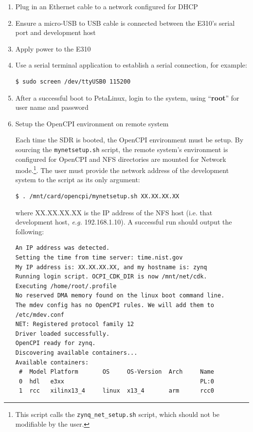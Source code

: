 \begin{enumerate}
\item Plug in an Ethernet cable to a network configured for DHCP
\item Ensure a micro-USB to USB cable is connected between the E310's serial port and development host
\item Apply power to the E310
\item Use a serial terminal application to establish a serial connection, for example:

\begin{verbatim}
$ sudo screen /dev/ttyUSB0 115200
\end{verbatim}

\item After a successful boot to PetaLinux, login to the system, using  ``\textbf{root}'' for user name and password

\item Setup the OpenCPI environment on remote system

\begin{flushleft}
Each time the SDR is booted, the OpenCPI environment must be setup. By sourcing the \texttt{mynetsetup.sh} script, the remote system's environment is configured for OpenCPI and NFS directories are mounted for Network mode.\footnote{This script calls the \texttt{zynq\_net\_setup.sh} script, which should not be modifiable by the user.}. The user must provide the network address of the development system to the script as its only argument:
\begin{verbatim}
$ . /mnt/card/opencpi/mynetsetup.sh XX.XX.XX.XX
\end{verbatim}

where XX.XX.XX.XX is the IP address of the NFS host (i.e. that development host, \textit{e.g.} 192.168.1.10). A successful run should output the following:
\begin{verbatim}
An IP address was detected.
Setting the time from time server: time.nist.gov
My IP address is: XX.XX.XX.XX, and my hostname is: zynq
Running login script. OCPI_CDK_DIR is now /mnt/net/cdk.
Executing /home/root/.profile
No reserved DMA memory found on the linux boot command line.
The mdev config has no OpenCPI rules. We will add them to /etc/mdev.conf
NET: Registered protocol family 12
Driver loaded successfully.
OpenCPI ready for zynq.
Discovering available containers...
Available containers:
 #  Model Platform       OS     OS-Version  Arch     Name
 0  hdl   e3xx                                       PL:0
 1  rcc   xilinx13_4     linux  x13_4       arm      rcc0
\end{verbatim}

\end{flushleft}
\end{enumerate}

